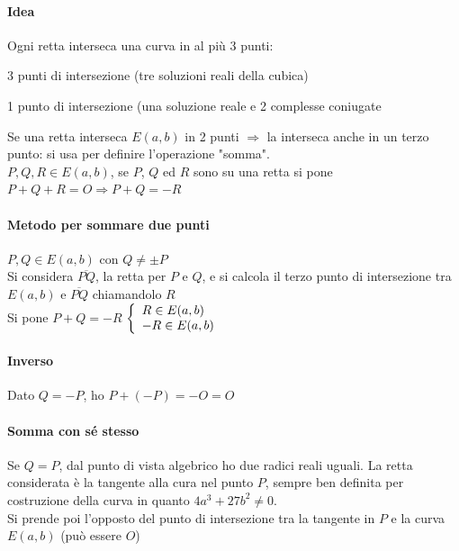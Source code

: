 \documentclass[10pt]{book}
\begin{document}
\paragraph{Idea} Ogni retta interseca una curva in al più 3 punti:
\begin{list}{}{}
	\item 3 punti di intersezione (tre soluzioni reali della cubica)
	\item 1 punto di intersezione (una soluzione reale e 2 complesse coniugate
\end{list}
Se una retta interseca $E(a,b)$ in 2 punti $\Rightarrow$ la interseca anche in un terzo punto: si usa per definire l'operazione "somma".\\
$P,Q,R\in E(a,b)$, se $P$, $Q$ ed $R$ sono su una retta si pone $P+Q+R = O \Rightarrow P + Q = -R$
\pagebreak
\begin{multicols}{2}
\paragraph{Metodo per sommare due punti} $P,Q\in E(a,b)$ con $Q\neq \pm P$\\
Si considera $\overline{PQ}$, la retta per $P$ e $Q$, e si calcola il terzo punto di intersezione tra $E(a,b)$ e $\overline{PQ}$ chiamandolo $R$\\
Si pone $P+Q = -R$ $\left\{\begin{array}{l l}
R \in E(a,b)\\
-R \in E(a,b)
\end{array}\right.$
\paragraph{Inverso} Dato $Q = -P$, ho $P + (-P) = -O = O$
\paragraph{Somma con sé stesso} Se $Q = P$, dal punto di vista algebrico ho due radici reali uguali. La retta considerata è la tangente alla cura nel punto $P$, sempre ben definita per costruzione della curva in quanto $4a^3 + 27b^2 \neq 0$.\\
Si prende poi l'opposto del punto di intersezione tra la tangente in $P$ e la curva $E(a,b)$ (può essere $O$)

\end{multicols}
\end{document}
